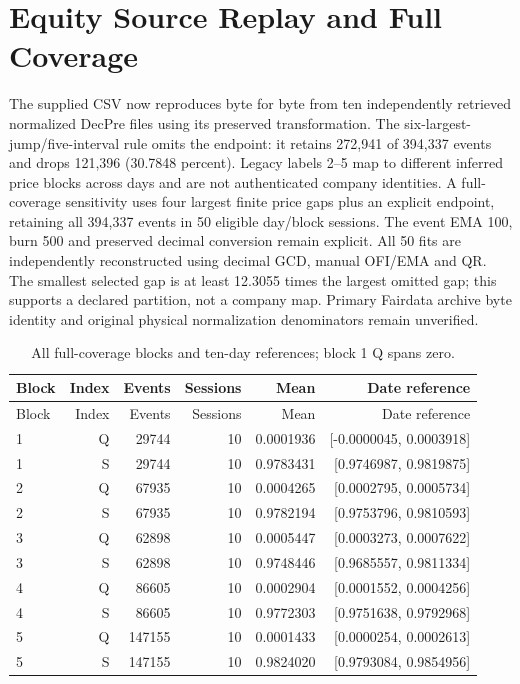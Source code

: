 \documentclass[10pt]{article}
\begin{document}
\section{Equity Source Replay and Full Coverage}
The supplied CSV now reproduces byte for byte from ten independently retrieved normalized DecPre files using its preserved transformation. The six-largest-jump/five-interval rule omits the endpoint: it retains 272,941 of 394,337 events and drops 121,396 (30.7848 percent). Legacy labels 2--5 map to different inferred price blocks across days and are not authenticated company identities. A full-coverage sensitivity uses four largest finite price gaps plus an explicit endpoint, retaining all 394,337 events in 50 eligible day/block sessions. The event EMA 100, burn 500 and preserved decimal conversion remain explicit. All 50 fits are independently reconstructed using decimal GCD, manual OFI/EMA and QR. The smallest selected gap is at least 12.3055 times the largest omitted gap; this supports a declared partition, not a company map. Primary Fairdata archive byte identity and original physical normalization denominators remain unverified.


\small\setlength{\tabcolsep}{3pt}
\begin{longtable}{lrrrrr}
\caption{All full-coverage blocks and ten-day references; block 1 Q spans zero.}\label{tab:equity_full_source}\\
\toprule
Block & Index & Events & Sessions & Mean & Date reference \\\midrule\endfirsthead
\toprule
Block & Index & Events & Sessions & Mean & Date reference \\\midrule\endhead
1 & Q & 29744 & 10 & 0.0001936 & [-0.0000045, 0.0003918] \\
1 & S & 29744 & 10 & 0.9783431 & [0.9746987, 0.9819875] \\
2 & Q & 67935 & 10 & 0.0004265 & [0.0002795, 0.0005734] \\
2 & S & 67935 & 10 & 0.9782194 & [0.9753796, 0.9810593] \\
3 & Q & 62898 & 10 & 0.0005447 & [0.0003273, 0.0007622] \\
3 & S & 62898 & 10 & 0.9748446 & [0.9685557, 0.9811334] \\
4 & Q & 86605 & 10 & 0.0002904 & [0.0001552, 0.0004256] \\
4 & S & 86605 & 10 & 0.9772303 & [0.9751638, 0.9792968] \\
5 & Q & 147155 & 10 & 0.0001433 & [0.0000254, 0.0002613] \\
5 & S & 147155 & 10 & 0.9824020 & [0.9793084, 0.9854956] \\
\bottomrule\end{longtable}\normalsize
\end{document}
